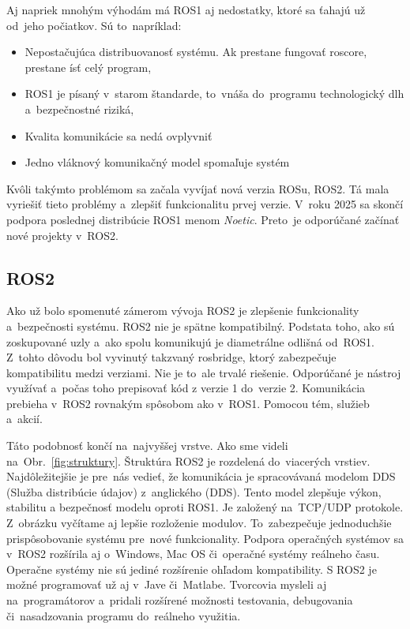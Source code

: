 \pagebreak

Aj napriek mnohým výhodám má ROS1 aj nedostatky, ktoré sa ťahajú už od~jeho počiatkov. Sú to~napríklad:
\begin{itemize}
	\item Nepostačujúca distribuovanosť systému. Ak prestane fungovať roscore, prestane ísť celý program,
	\item ROS1 je písaný v~starom štandarde, to~vnáša do~programu technologický dlh a~bezpečnostné riziká,
	\item Kvalita komunikácie sa nedá ovplyvniť
	\item Jedno vláknový komunikačný model spomaľuje systém
\end{itemize}

Kvôli takýmto problémom sa začala vyvíjať nová verzia ROSu, ROS2. Tá mala vyriešiť tieto problémy a~zlepšiť funkcionalitu prvej verzie. V~roku 2025 sa skončí
podpora poslednej distribúcie ROS1 menom \textit{Noetic}. Preto~je odporúčané začínať nové projekty v~ROS2.

\subsection{ROS2}

Ako už bolo spomenuté zámerom vývoja ROS2 je zlepšenie funkcionality a~bezpečnosti systému. ROS2 nie je spätne kompatibilný.
Podstata toho, ako sú zoskupované uzly a~ako spolu komunikujú je diametrálne odlišná od~ROS1. Z~tohto dôvodu bol vyvinutý takzvaný rosbridge,
ktorý zabezpečuje kompatibilitu medzi verziami. Nie je to~ale trvalé riešenie. Odporúčané je nástroj využívať a~počas toho prepisovať kód
z verzie 1 do~verzie 2. Komunikácia prebieha \newline v~ROS2 rovnakým spôsobom ako v~ROS1. Pomocou tém, služieb a~akcií.

Táto podobnosť končí na~najvyššej vrstve. Ako sme videli na~Obr.~\ref{fig:struktury}. Štruktúra ROS2 je rozdelená do~viacerých vrstiev.
Najdôležitejšie je pre~nás vedieť, že komunikácia je spracovávaná modelom DDS (Služba distribúcie údajov) z~anglického (\acrlong{DDS}). Tento model zlepšuje výkon, stabilitu
a bezpečnosť modelu oproti ROS1. Je založený na~TCP/UDP protokole. Z~obrázku vyčítame aj lepšie rozloženie modulov. To~zabezpečuje jednoduchšie
prispôsobovanie systému pre~nové funkcionality. Podpora operačných systémov sa v~ROS2 rozšírila aj o~Windows, Mac OS či~operačné systémy reálneho času.
Operačne systémy nie sú jediné rozšírenie ohľadom kompatibility. S ROS2 je možné programovať už aj v~Jave či~Matlabe.
Tvorcovia mysleli aj na~programátorov a~pridali rozšírené možnosti testovania, debugovania či~nasadzovania programu do~reálneho využitia.

